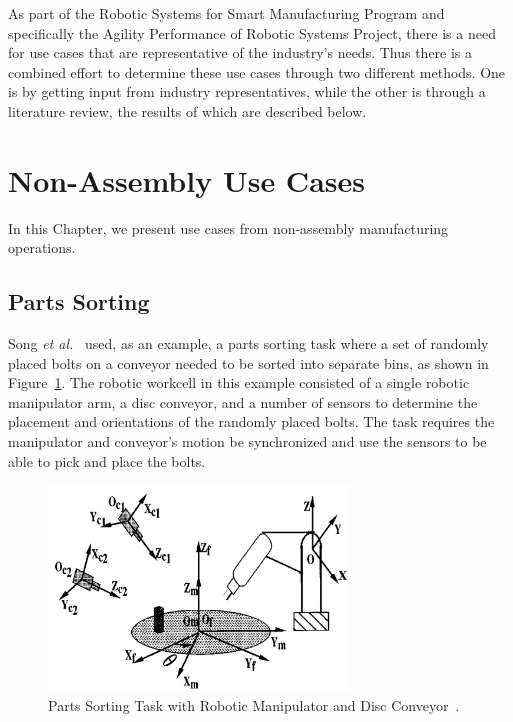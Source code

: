 \label{chapter:DOWNS}
As part of the Robotic Systems for Smart Manufacturing Program and specifically the Agility
Performance of Robotic Systems Project, there is a need for use cases that are representative of the
industry’s needs. Thus there is a combined effort to determine these use cases through two different
methods. One is by getting input from industry representatives, while the other is through a literature
review, the results of which are described below.
\section{Non-Assembly Use Cases}
In this Chapter, we present use cases from non-assembly manufacturing operations.
\subsection{Parts Sorting}
Song \textit{et al.}~\cite{Song.2000} used, as an example, a parts sorting task where a set of randomly placed bolts on a conveyor needed to be sorted into separate bins, as shown in Figure~\ref{fig:Tony1}. The robotic workcell in this example consisted of a single robotic manipulator arm, a disc conveyor, and a number of sensors to determine the placement and orientations of the randomly placed bolts. The task requires the manipulator and conveyor’s motion be synchronized and use the sensors to be able to pick and place the bolts.

\begin{figure}[!htb]
\centering
\includegraphics[width=8cm]{Figures/Tony-Fig1.jpg}
\caption{Parts Sorting Task with Robotic Manipulator and Disc Conveyor~\cite{Song.2000}.}
\label{fig:Tony1}
\end{figure}

